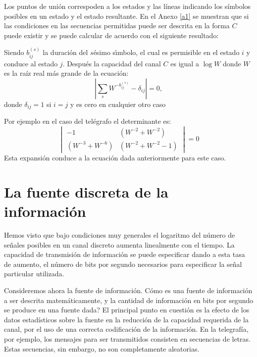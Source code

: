 Los puntos de uni\'on correspoden a los estados y las l\'ineas
indicando los s\'imbolos posibles en un estado y el estado resultante.
En el Anexo \ref{a1} se muestran que si las condiciones en las
secuencias permitidas puede ser descrita en la forma $C$ puede existir
y se puede calcular de acuerdo con el siguiente resultado:
\begin{theorem}
 Siendo $b_{ij}^{(s)}$ la duraci\'on del $s$\'{e}simo s\'{\i}mbolo, el
cual es permisible en el estado $i$ y conduce al estado $j$. Despu\'es la
capacidad del canal $C$ es igual a $\log W$ donde $W$ es la ra\'iz real
m\'as grande de la ecuaci\'on:
\begin{equation}
\left|\sum_{s}W^{-b_{ij}^{(s)}}-\delta_{ij}\right|=0,
\end{equation}
donde $\delta_{ij}=1$ si $i=j$ y es cero en cualquier otro caso
\end{theorem}
Por ejemplo en el caso del tel\'egrafo el determinante es:
\begin{equation}
\begin{vmatrix}
-1&(W^{-2}+W^{-2}) \\ 
 (W^{-3}+W^{-6})&(W^{-2}+W^{-2}-1) 
\end{vmatrix}=0
\end{equation}
Esta expansi\'on conduce a la ecuaci\'on dada anteriormente para este
caso.

\clearpage

\chapter{La fuente discreta de la informaci\'on}
\label{sec:2}

Hemos visto que bajo condiciones muy generales el logaritmo del
n\'umero de se\~nales posibles en un canal discreto aumenta
linealmente con el tiempo. La capacidad de transmisi\'on de
informaci\'on se puede especificar dando a esta tasa de aumento, el
n\'umero de bits por segundo necesarios para especificar la se\~nal
particular utilizada.  

Consideremos ahora la fuente de
informaci\'on. {\textquestiondown}C\'omo es una fuente de
informaci\'on a ser descrita matem\'aticamente, y la cantidad de
informaci\'on en bits por segundo se produce en una fuente dada? El
principal punto en cuesti\'on es la efecto de los datos estad\'isticos
sobre la fuente en la reducci\'on de la capacidad requerida de la
canal, por el uso de una correcta codificaci\'on de la
informaci\'on. En la telegraf\'ia, por ejemplo, los mensajes para ser
transmitidos consisten en secuencias de letras. Estas secuencias, sin
embargo, no son completamente aleatorias.

